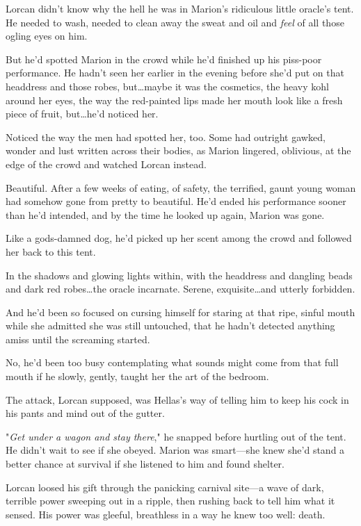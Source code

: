 Lorcan didn't know why the hell he was in Marion's ridiculous little oracle's tent.
He needed to wash, needed to clean away the sweat and oil and \emph{feel} of all those ogling eyes on him.

But he'd spotted Marion in the crowd while he'd finished up his piss-poor performance.
He hadn't seen her earlier in the evening before she'd put on that headdress and those robes, but\ldots maybe it was the cosmetics, the heavy kohl around her eyes, the way the red-painted lips made her mouth look like a fresh piece of fruit, but\ldots he'd noticed her.

Noticed the way the men had spotted her, too.
Some had outright gawked, wonder and lust written across their bodies, as Marion lingered, oblivious, at the edge of the crowd and watched Lorcan instead.

Beautiful.
After a few weeks of eating, of safety, the terrified, gaunt young woman had somehow gone from pretty to beautiful.
He'd ended his performance sooner than he'd intended, and by the time he looked up again, Marion was gone.

Like a gods-damned dog, he'd picked up her scent among the crowd and followed her back to this tent.

In the shadows and glowing lights within, with the headdress and dangling beads and dark red robes\ldots the oracle incarnate.
Serene, exquisite\ldots and utterly forbidden.

And he'd been so focused on cursing himself for staring at that ripe, sinful mouth while she admitted she was still untouched, that he hadn't detected anything amiss until the screaming started.

No, he'd been too busy contemplating what sounds might come from that full mouth if he slowly, gently, taught her the art of the bedroom.

The attack, Lorcan supposed, was Hellas's way of telling him to keep his cock in his pants and mind out of the gutter.

"\emph{Get under a wagon and stay there}," he snapped before hurtling out of the tent.
He didn't wait to see if she obeyed.
Marion was smart---she knew she'd stand a better chance at survival if she listened to him and found shelter.

Lorcan loosed his gift through the panicking carnival site---a wave of dark, terrible power sweeping out in a ripple, then rushing back to tell him what it sensed.
His power was gleeful, breathless in a way he knew too well: death.

